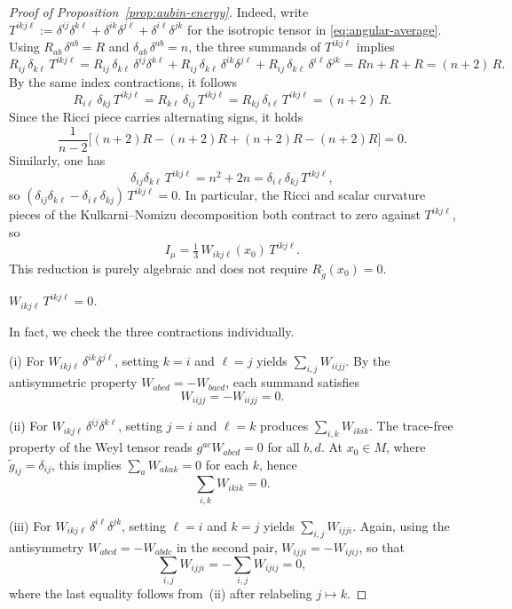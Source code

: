 \documentclass[reqno,11pt]{amsart}
\numberwithin{equation}{section}
\theoremstyle{definition}
\theoremstyle{remark}
\begin{document}
\begin{proof}[Proof of Proposition~\ref{prop:aubin-energy}]
\smallskip
\noindent Indeed, write $T^{ikj\ell} := \delta^{ij}\delta^{k\ell} + \delta^{ik}\delta^{j\ell} + \delta^{i\ell}\delta^{jk}$ for the isotropic tensor in \eqref{eq:angular-average}. Using $R_{ab}\,\delta^{ab} = R$ and $\delta_{ab}\,\delta^{ab} = n$, the three summands of $T^{ikj\ell}$ implies 
\[
R_{ij}\,\delta_{k\ell}\, T^{ikj\ell}
= R_{ij}\,\delta_{k\ell}\,\delta^{ij}\delta^{k\ell}
+ R_{ij}\,\delta_{k\ell}\,\delta^{ik}\delta^{j\ell}
+ R_{ij}\,\delta_{k\ell}\,\delta^{i\ell}\delta^{jk}
= Rn + R + R = (n+2)\,R.
\]
By the same index contractions, it follows
\[
R_{i\ell}\,\delta_{kj}\, T^{ikj\ell} = R_{k\ell}\,\delta_{ij}\, T^{ikj\ell} = R_{kj}\,\delta_{i\ell}\, T^{ikj\ell} = (n+2)\,R.
\]
Since the Ricci piece carries alternating signs, it holds
\[
\frac{1}{n-2}\bigl[(n+2)R - (n+2)R + (n+2)R - (n+2)R\bigr] = 0.
\]
Similarly, one has
\[
\delta_{ij}\delta_{k\ell}\, T^{ikj\ell} = n^2 + 2n = \delta_{i\ell}\delta_{kj}\, T^{ikj\ell},
\]
so $(\delta_{ij}\delta_{k\ell} - \delta_{i\ell}\delta_{kj})\, T^{ikj\ell} = 0$.
In particular, the Ricci and scalar curvature pieces of the Kulkarni--Nomizu decomposition both contract to zero against $T^{ikj\ell}$, so
\[
I_\mu = \tfrac{1}{3}\,W_{ikj\ell}(x_0)\, T^{ikj\ell}.
\]
This reduction is purely algebraic and does not require $R_{\tilde{g}}(x_0) = 0$.

\smallskip
{} {\it $W_{ikj\ell}\, T^{ikj\ell} = 0$.}

\smallskip
\noindent In fact, we check the three contractions individually.

\smallskip
\noindent\textrm{(i)} For $W_{ikj\ell}\,\delta^{ik}\delta^{j\ell}$, setting $k = i$ and $\ell = j$ yields $\sum_{i,j} W_{iijj}$. By the antisymmetric property $W_{abcd} = -W_{bacd}$, each summand satisfies 
\[
W_{iijj} = -W_{iijj} = 0.
\]

\smallskip
\noindent\textrm{(ii)} For $W_{ikj\ell}\,\delta^{ij}\delta^{k\ell}$, setting $j = i$ and $\ell = k$ produces $\sum_{i,k} W_{ikik}$. The trace-free property of the Weyl tensor reads $g^{ac}W_{abcd} = 0$ for all $b, d$. At $x_0\in M$, where $\tilde{g}_{ij} = \delta_{ij}$, this implies $\sum_a W_{akak} = 0$ for each $k$, hence 
\[
\sum_{i,k} W_{ikik} = 0.
\]

\smallskip
\noindent\textrm{(iii)} For $W_{ikj\ell}\,\delta^{i\ell}\delta^{jk}$, setting $\ell = i$ and $k = j$ yields $\sum_{i,j} W_{ijji}$. Again, using the antisymmetry $W_{abcd} = -W_{abdc}$ in the second pair, $W_{ijji} = -W_{ijij}$, so that
\[
\sum_{i,j} W_{ijji} = -\sum_{i,j} W_{ijij} = 0,
\]
where the last equality follows from~(ii) after relabeling $j \mapsto k$.


\end{proof}
\end{document}
